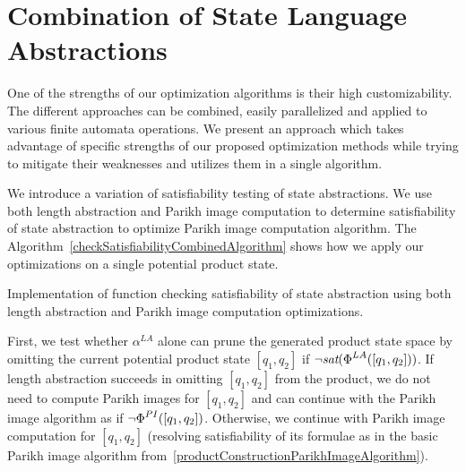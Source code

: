 
\section{Combination of State Language Abstractions}

One of the strengths of our optimization algorithms is their high customizability. The different approaches can be combined, easily parallelized and applied to various finite automata operations. We present an approach which takes advantage of specific strengths of our proposed optimization methods while trying to mitigate their weaknesses and utilizes them in a single algorithm.

We introduce a variation of satisfiability testing of state abstractions. We use both length abstraction and Parikh image computation to determine satisfiability of state abstraction to optimize Parikh image computation algorithm. The Algorithm~\ref{checkSatisfiabilityCombinedAlgorithm} shows how we apply our optimizations on a single potential product state.

\begin{algorithm}[ht]
\caption{Implementation of function checking satisfiability of state abstraction using both length abstraction and Parikh image computation optimizations.}\label{checkSatisfiabilityCombinedAlgorithm}



\DontPrintSemicolon

\end{algorithm}

First, we test whether $\alpha^{LA}$ alone can prune the generated product state space by omitting the current potential product state $[q_1, q_2]$ if $\neg \emph{sat}(\emph{$\Phi$}^{LA}([q_1, q_2]))$. If length abstraction succeeds in omitting $[q_1, q_2]$ from the product, we do not need to compute Parikh images for $[q_1, q_2]$ and can continue with the Parikh image algorithm as if $\neg \emph{$\Phi$}^{PI}([q_1, q_2])$. Otherwise, we continue with Parikh image computation for $[q_1, q_2]$ (resolving satisfiability of its formulae as in the basic Parikh image algorithm from~\ref{productConstructionParikhImageAlgorithm}).

